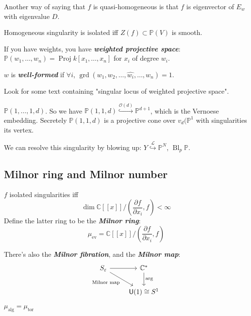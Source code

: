 Another way of saying that $f$ is quasi-homogeneous is that $f$ is eigenvector of $E_w$ with eigenvalue $D$.

\begin{exercise}
	Homogeneous singularity is isolated iff $Z(f)\subset \mathbb{P}(V)$ is smooth.
\end{exercise}

If you have weights, you have \textit{\textbf{weighted projective space}}: $\mathbb{P}(w_1,\ldots,w_n)=\operatorname{Proj} k[x_1,\ldots,x_n]$ for $x_i$ of degree $w_i$.

\begin{defn}
	$w$ is \textit{\textbf{well-formed}} if $\forall i$, $\operatorname{grd}(w_1,w_2,\ldots,\hat{w_i},\ldots,w_n)=1$.
\end{defn}

Look for some text containing "singular locus of weighted projective space".

\begin{example}
	$\mathbb{P}(1,\ldots,1,d)$. So we have $\mathbb{P}(1,1,d)\overset{\mathcal{O}(d)}{\hookrightarrow} \mathbb{P}^{d+1}$, which is the Vernoese embedding. Secretely $\mathbb{P}(1,1,d)$ is a projective cone over $v_d(\mathbb{P}^1$ with singularities its vertex.

	We can resolve this singularity by blowing up: $Y\overset{\mathcal{L}}{\hookrightarrow}\mathbb{P}^N$, $\operatorname{ B l}_p\mathbb{P}$.
\end{example}

\subsection{Milnor ring and Milnor number}
$f$ isolated singularities iff
\begin{equation*}
	\dim\mathbb{C}[[x]]/\left( \frac{\partial f}{\partial x_i} ,f \right) <\infty
\end{equation*}
Define the latter ring to be the \textbf{\textit{Milnor ring}}:
\[\mu_{\operatorname{ e v}}=\mathbb{C}[[x]]/\left( \frac{\partial f}{\partial x_i} ,f \right)\]

There's also the \textbf{\textit{Milnor fibration}}, and the \textbf{\textit{Milnor map}}:
\[\begin{tikzcd}
	S_\varepsilon\arrow[dr,"\text{Milnor map}",swap]\arrow[r]&\mathbb{C}^*\arrow[d,"\arg"]\\
	&\mathsf{U}(1)\cong S^1
\end{tikzcd}\]
\begin{thm}[Milnor]
	$\mu_{\operatorname{ a l g}}=\mu_{\operatorname{ to r}}$
\end{thm}

